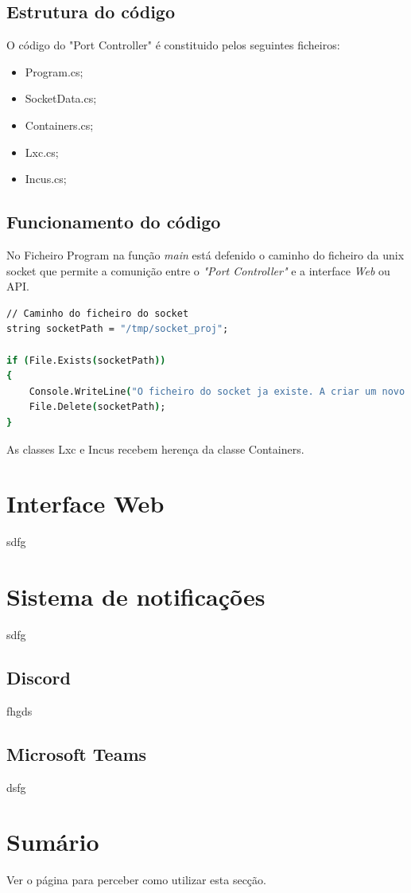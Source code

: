 \subsection{Estrutura do código}

O código do "Port Controller" é constituido pelos seguintes ficheiros:

\begin{itemize}
    \item Program.cs;
    \item SocketData.cs;
    \item Containers.cs;
    \item Lxc.cs;
    \item Incus.cs;
\end{itemize}

\subsection{Funcionamento do código}


No Ficheiro Program na função \textit{main} está defenido o caminho do ficheiro 
da unix socket que permite a comunição entre o \textit{"Port Controller"} e 
a interface \textit{Web} ou API.


\begin{lstlisting}[language=csh, caption={teste}]
// Caminho do ficheiro do socket
string socketPath = "/tmp/socket_proj";

if (File.Exists(socketPath))
{
    Console.WriteLine("O ficheiro do socket ja existe. A criar um novo...");
    File.Delete(socketPath);
}

\end{lstlisting}




As classes Lxc e Incus recebem herença da classe Containers.


\section{Interface Web}

sdfg


\section{Sistema de notificações}

sdfg

\subsection{Discord}

fhgds

\subsection{Microsoft Teams}

dsfg

\section*{Sumário}

Ver o  página \pageref{sec:intro_summary} para perceber como utilizar esta secção.


